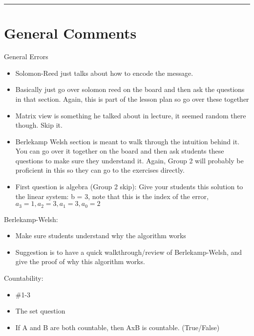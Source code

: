 \documentclass{exam}
\title{}
\date{Berlekamp-Welsh, Countability, Self Reference, Counting}
\begin{document}
\maketitle
\rule{\textwidth}{0.15em}
\fontsize{12}{15}\selectfont
\thispagestyle{empty}


\section{General Comments}
\begin{questions}
\item General Errors
\begin{itemize}
	\item Solomon-Reed just talks about how to encode the message.
	\item Basically just go over solomon reed on the board and then ask the questions in that section. Again, this is part of the lesson plan so go over these together
	\item Matrix view is something he talked about in lecture, it seemed random there though. Skip it.
	\item Berlekamp Welsh section is meant to walk through the intuition behind it. You can go over it together on the board and then ask students these questions to make sure they understand it. Again, Group 2 will probably be proficient in this so they can go to the exercises directly.
	\item First question is algebra (Group 2 skip): Give your students this solution to the linear system: b = 3, note that this is the index of the error, $a_3 = 1, a_2 = 3, a_1 = 3, a_0 = 2$
\end{itemize}
\item Berlekamp-Welsh: 
\begin{itemize}
\item Make sure students understand why the algorithm works
\item Suggestion is to have a quick walkthrough/review of Berlekamp-Welsh, and give the proof of why this algorithm works.
\end{itemize}
\item Countability: 
\begin{itemize}
\item \#1-3 
\item The set question
\item If A and B are both countable, then AxB is countable. (True/False)
\end{itemize}

\end{questions}
\end{document}
